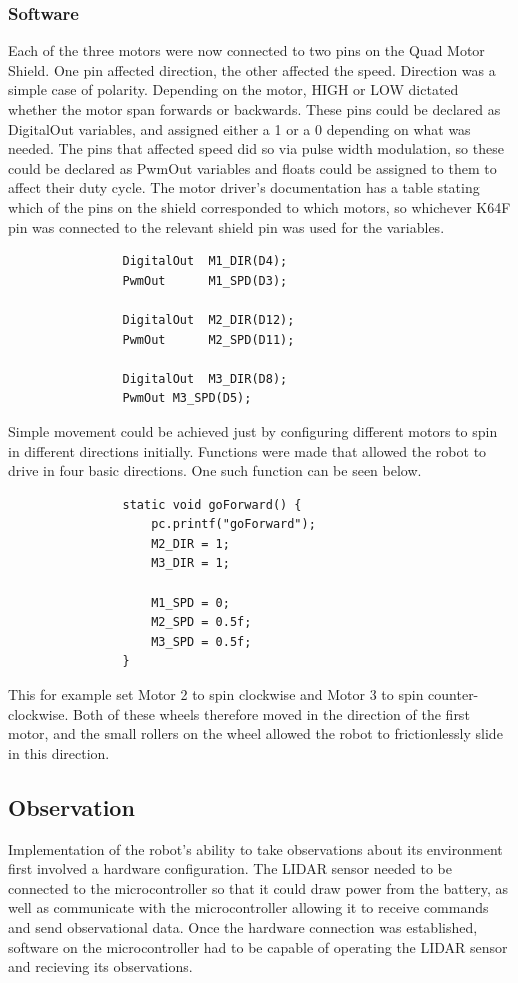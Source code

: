 				\subsubsection{Software}
				Each of the three motors were now connected to two pins on the Quad Motor Shield. One pin affected direction, the other affected the speed. Direction was a simple case of polarity. Depending on the motor, HIGH or LOW dictated whether the motor span forwards or backwards. These pins could be declared as DigitalOut variables, and assigned either a 1 or a 0 depending on what was needed.  The pins that affected speed did so via pulse width modulation, so these could be declared as PwmOut variables and floats could be assigned to them to affect their duty cycle. The motor driver's documentation has a table stating which of the pins on the shield corresponded to which motors, so whichever K64F pin was connected to the relevant shield pin was used for the variables.
				
				\begin{lstlisting}
				DigitalOut  M1_DIR(D4);
				PwmOut      M1_SPD(D3);
				
				DigitalOut  M2_DIR(D12);
				PwmOut      M2_SPD(D11);
				
				DigitalOut  M3_DIR(D8);
				PwmOut M3_SPD(D5);
				\end{lstlisting}
				
				Simple movement could be achieved just by configuring different motors to spin in different directions initially. Functions were made that allowed the robot to drive in four basic directions. One such function can be seen below.
				\begin{lstlisting}
				static void goForward() {
					pc.printf("goForward");
					M2_DIR = 1;
					M3_DIR = 1;
				
					M1_SPD = 0;
					M2_SPD = 0.5f;
					M3_SPD = 0.5f;
				}
				\end{lstlisting}
				
				This for example set Motor 2 to spin clockwise and Motor 3 to spin counter-clockwise. Both of these wheels therefore moved in the direction of the first motor, and the small rollers on the wheel allowed the robot to frictionlessly slide in this direction.
				
				
			\subsection{Observation}
			Implementation of the robot's ability to take observations about its environment first involved a hardware configuration. The LIDAR sensor needed to be connected to the microcontroller so that it could draw power from the battery, as well as communicate with the microcontroller allowing it to receive commands and send observational data. Once the hardware connection was established, software on the microcontroller had to be capable of operating the LIDAR sensor and recieving its observations.
